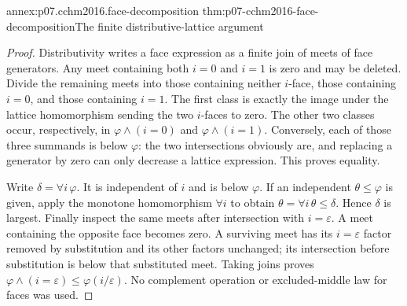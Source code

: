 \begin{annexitem}{annex:p07.cchm2016.face-decomposition}
 {thm:p07-cchm2016-face-decomposition}{The finite distributive-lattice argument}
\begin{proof}
Distributivity writes a face expression as a finite join of meets of
face generators.  Any meet containing both \(i=0\) and \(i=1\)
is zero and may be deleted.  Divide the remaining meets into those
containing neither \(i\)-face, those containing \(i=0\), and those
containing \(i=1\).  The first class is exactly the image under the
lattice homomorphism sending the two \(i\)-faces to zero.
The other two classes occur, respectively, in
\(\varphi\wedge(i=0)\) and \(\varphi\wedge(i=1)\).
Conversely, each of those three summands is below \(\varphi\):
the two intersections obviously are, and replacing a generator by
zero can only decrease a lattice expression.  This proves equality.

Write \(\delta=\forall i\,\varphi\).  It is independent of \(i\)
and is below \(\varphi\).  If an independent \(\theta\leq\varphi\)
is given, apply the monotone homomorphism \(\forall i\) to obtain
\(\theta=\forall i\,\theta\leq\delta\).  Hence \(\delta\) is largest.
Finally inspect the same meets after intersection with \(i=\varepsilon\).
A meet containing the opposite face becomes zero.  A surviving meet
has its \(i=\varepsilon\) factor removed by substitution and its
other factors unchanged; its intersection before substitution is
below that substituted meet.  Taking joins proves
\(\varphi\wedge(i=\varepsilon)\leq\varphi(i/\varepsilon)\).
No complement operation or excluded-middle law for faces was used.
\end{proof}
\end{annexitem}

